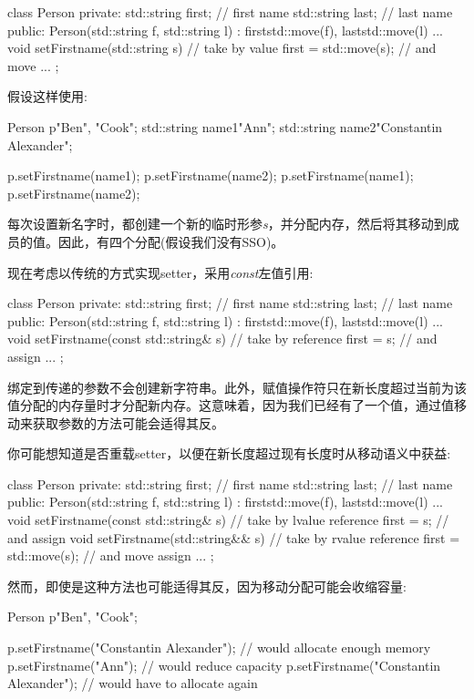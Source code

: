 \begin{cppcode}
class Person {
private:
	std::string first; // first name
	std::string last; // last name
public:
	Person(std::string f, std::string l)
	: first{std::move(f)}, last{std::move(l)} {
	}
	...
	void setFirstname(std::string s) { // take by value
		first = std::move(s); // and move
	}
	...
};
\end{cppcode}

假设这样使用:

\begin{cppcode}
Person p{"Ben", "Cook"};
std::string name1{"Ann"};
std::string name2{"Constantin Alexander"};

p.setFirstname(name1);
p.setFirstname(name2);
p.setFirstname(name1);
p.setFirstname(name2);
\end{cppcode}

每次设置新名字时，都创建一个新的临时形参\textit{s}，并分配内存，然后将其移动到成员的值。因此，有四个分配(假设我们没有SSO)。

现在考虑以传统的方式实现setter，采用\textit{const}左值引用:

\begin{cppcode}
class Person {
private:
	std::string first; // first name
	std::string last; // last name
public:
	Person(std::string f, std::string l)
	: first{std::move(f)}, last{std::move(l)} {
	}
	...
	void setFirstname(const std::string& s) { // take by reference
		first = s; // and assign
	}
	...
};
\end{cppcode}

绑定到传递的参数不会创建新字符串。此外，赋值操作符只在新长度超过当前为该值分配的内存量时才分配新内存。这意味着，因为我们已经有了一个值，通过值移动来获取参数的方法可能会适得其反。

你可能想知道是否重载setter，以便在新长度超过现有长度时从移动语义中获益:

\begin{cppcode}
class Person {
private:
	std::string first; // first name
	std::string last; // last name
public:
	Person(std::string f, std::string l)
	: first{std::move(f)}, last{std::move(l)} {
	}
	...
	void setFirstname(const std::string& s) { // take by lvalue reference
		first = s; // and assign
	}
	void setFirstname(std::string&& s) { // take by rvalue reference
		first = std::move(s); // and move assign
	}
	...
};
\end{cppcode}

然而，即使是这种方法也可能适得其反，因为移动分配可能会收缩容量:

\begin{cppcode}
Person p{"Ben", "Cook"};

p.setFirstname("Constantin Alexander"); // would allocate enough memory
p.setFirstname("Ann"); // would reduce capacity
p.setFirstname("Constantin Alexander"); // would have to allocate again
\end{cppcode}

